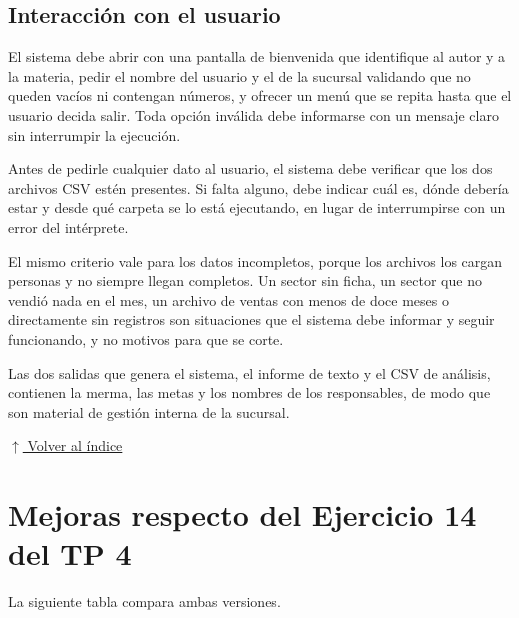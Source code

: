 \documentclass[12pt]{article}
\newcommand{\volverindice}{%
    \vspace{1em}%
    \begin{flushright}%
        \hyperlink{indice}{\small $\uparrow$ Volver al índice}%
    \end{flushright}%
}
\begin{document}
\subsection{Interacción con el usuario}

El sistema debe abrir con una pantalla de bienvenida que identifique al autor y a la materia, pedir el nombre del usuario y el de la sucursal validando que no queden vacíos ni contengan números, y ofrecer un menú que se repita hasta que el usuario decida salir. Toda opción inválida debe informarse con un mensaje claro sin interrumpir la ejecución.

Antes de pedirle cualquier dato al usuario, el sistema debe verificar que los dos archivos CSV estén presentes. Si falta alguno, debe indicar cuál es, dónde debería estar y desde qué carpeta se lo está ejecutando, en lugar de interrumpirse con un error del intérprete.

El mismo criterio vale para los datos incompletos, porque los archivos los cargan personas y no siempre llegan completos. Un sector sin ficha, un sector que no vendió nada en el mes, un archivo de ventas con menos de doce meses o directamente sin registros son situaciones que el sistema debe informar y seguir funcionando, y no motivos para que se corte.

Las dos salidas que genera el sistema, el informe de texto y el CSV de análisis, contienen la merma, las metas y los nombres de los responsables, de modo que son material de gestión interna de la sucursal.

\volverindice

\newpage

\section{Mejoras respecto del Ejercicio 14 del TP 4}
\label{sec:mejoras}

La siguiente tabla compara ambas versiones.
\end{document}
